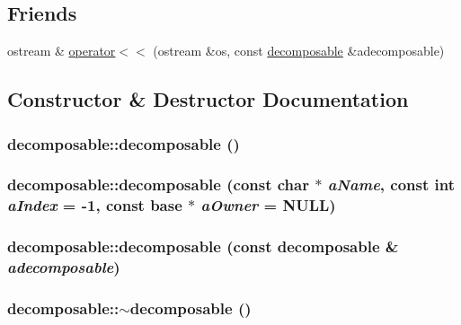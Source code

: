 \subsection*{Friends}
\begin{DoxyCompactItemize}
\item 
ostream \& \hyperlink{classdecomposable_a44e65cd8ff15e859dba4d1bfd1003c98}{operator$<$$<$} (ostream \&os, const \hyperlink{classdecomposable}{decomposable} \&adecomposable)
\end{DoxyCompactItemize}


\subsection{Constructor \& Destructor Documentation}
\hypertarget{classdecomposable_a0010b71ca2712188527a6591a6323a06}{
\subsubsection[{decomposable}]{\setlength{\rightskip}{0pt plus 5cm}decomposable::decomposable ()}}
\label{classdecomposable_a0010b71ca2712188527a6591a6323a06}
\hypertarget{classdecomposable_a22cfbed71b755ecaadd331c7d22cfe20}{
\subsubsection[{decomposable}]{\setlength{\rightskip}{0pt plus 5cm}decomposable::decomposable (const char $\ast$ {\em aName}, \/  const int {\em aIndex} = {\ttfamily -\/1}, \/  const {\bf base} $\ast$ {\em aOwner} = {\ttfamily NULL})}}
\label{classdecomposable_a22cfbed71b755ecaadd331c7d22cfe20}
\hypertarget{classdecomposable_a3a81f3d097548e761c2731c92ca50cd5}{
\subsubsection[{decomposable}]{\setlength{\rightskip}{0pt plus 5cm}decomposable::decomposable (const {\bf decomposable} \& {\em adecomposable})}}
\label{classdecomposable_a3a81f3d097548e761c2731c92ca50cd5}
\hypertarget{classdecomposable_a370cdd448696895ac190d6b80eb41513}{
\subsubsection[{$\sim$decomposable}]{\setlength{\rightskip}{0pt plus 5cm}decomposable::$\sim$decomposable ()}}
\label{classdecomposable_a370cdd448696895ac190d6b80eb41513}


